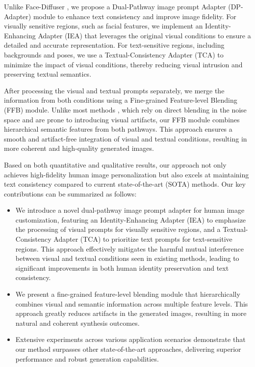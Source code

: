Unlike Face-Diffuser \cite{wang2024high}, we propose a Dual-Pathway image prompt Adapter  (DP-Adapter) module to enhance text consistency and improve image fidelity. For visually sensitive regions, such as facial features, we implement an Identity-Enhancing Adapter (IEA) that leverages the original visual conditions to ensure a detailed and accurate representation. For text-sensitive regions, including backgrounds and poses, we use a Textual-Consistency Adapter (TCA) to minimize the impact of visual conditions, thereby reducing visual intrusion and preserving textual semantics.

After processing the visual and textual prompts separately, we merge the information from both conditions using a Fine-grained Feature-level Blending (FFB) module. Unlike most methods \cite{avrahami2022blended, zhao2023magicfusion, wang2024high}, which rely on direct blending in the noise space and are prone to introducing visual artifacts, our FFB module combines hierarchical semantic features from both pathways. This approach ensures a smooth and artifact-free integration of visual and textual conditions, resulting in more coherent and high-quality generated images.

Based on both quantitative and qualitative results, our approach not only achieves high-fidelity human image personalization but also excels at maintaining text consistency compared to current state-of-the-art (SOTA) methods. Our key contributions can be summarized as follows:
\begin{itemize}
\item We introduce a novel dual-pathway image prompt adapter for human image customization, featuring an Identity-Enhancing Adapter (IEA) to emphasize the processing of visual prompts for visually sensitive regions, and a Textual-Consistency Adapter (TCA) to prioritize text prompts for text-sensitive regions. This approach effectively mitigates the harmful mutual interference between visual and textual conditions seen in existing methods, leading to significant improvements in both human identity preservation and text consistency.

\item We present a fine-grained feature-level blending module that hierarchically combines visual and semantic information across multiple feature levels. This approach greatly reduces artifacts in the generated images, resulting in more natural and coherent synthesis outcomes.

\item Extensive experiments across various application scenarios demonstrate that our method surpasses other state-of-the-art approaches, delivering superior performance and robust generation capabilities.
\end{itemize}
